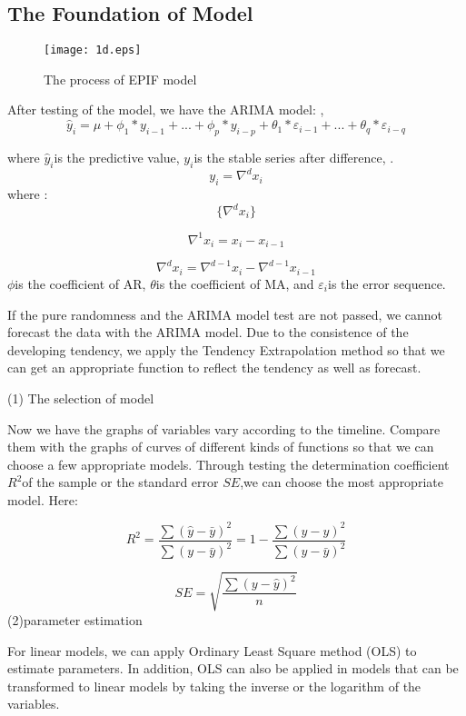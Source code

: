 \subsection{The Foundation of Model}

\begin{figure}[h]

\centering
\texttt{[image: 1d.eps]}
\caption{The process of EPIF model} \label{fig:aa}
\end{figure}

After testing of the model, we have the ARIMA model:
 ,
\[{\hat y_i} = \mu  + {\phi _1}*{y_{i - 1}} + ... + {\phi _p}*{y_{i - p}} + {\theta _1}*{\varepsilon _{i - 1}} + ... + {\theta _q}*{\varepsilon _{i - q}}\]

where  $\hat y_i$is the predictive value, $ {y_i}$is the stable series after difference,  .\[{y_i} = {\nabla ^d}{x_i}\]
where :\[\{ {\nabla ^d}{x_i}\} \]
	  
\[{\nabla ^1}{x_i} = {x_i} - {x_{i - 1}}\]
	  
\[{\nabla ^d}{x_i} = {\nabla ^{d - 1}}{x_i} - {\nabla ^{d - 1}}{x_{i - 1}}\]
  $\phi $is the coefficient of AR,   $\theta $is the coefficient of MA, and  $ {\varepsilon _i}$is the error sequence.





 If the pure randomness and the ARIMA model test are not passed, we cannot forecast the data with the ARIMA model. Due to the consistence of the developing tendency, we apply the Tendency Extrapolation method so that we can get an appropriate function to reflect the tendency as well as forecast.


(1)	The selection of model

Now we have the graphs of variables vary according to the timeline. Compare them with the graphs of curves of different kinds of functions so that we can choose a few appropriate models. Through testing the determination coefficient  $R^2$of the sample or the standard error  $SE$,we can choose the most appropriate model. Here:
 
\[{R^2} = \frac{{\sum {{{(\hat y - \bar y)}^2}} }}{{\sum {{{(y - \bar y)}^2}} }} = 1 - \frac{{\sum {{{(y - \hat y)}^2}} }}{{\sum {{{(y - \bar y)}^2}} }}\]
 
\[SE = \sqrt {\frac{{\sum {{{(y - \hat y)}^2}} }}{n}} \]
(2)parameter estimation

For linear models, we can apply Ordinary Least Square method (OLS) to estimate parameters. In addition, OLS can also be applied in models that can be transformed to linear models by taking the inverse or the logarithm of the variables.



